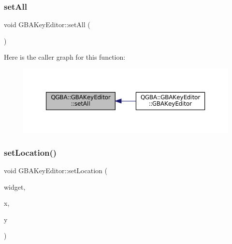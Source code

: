 \subsubsection{\texorpdfstring{set\+All}{setAll}}
{\footnotesize\ttfamily void G\+B\+A\+Key\+Editor\+::set\+All (\begin{DoxyParamCaption}{ }\end{DoxyParamCaption})\hspace{0.3cm}{\ttfamily [slot]}}

Here is the caller graph for this function\+:
\nopagebreak
\begin{figure}[H]
\begin{center}
\leavevmode
\includegraphics[width=350pt]{class_q_g_b_a_1_1_g_b_a_key_editor_a4069ad1c61470f1d304aa7b7cf944261_icgraph}
\end{center}
\end{figure}
\mbox{\label{class_q_g_b_a_1_1_g_b_a_key_editor_af41d655d8129ab4991fbb4b131705658}} 
\subsubsection{\texorpdfstring{set\+Location()}{setLocation()}}
{\footnotesize\ttfamily void G\+B\+A\+Key\+Editor\+::set\+Location (\begin{DoxyParamCaption}\item[{Q\+Widget $\ast$}]{widget,  }\item[{qreal}]{x,  }\item[{qreal}]{y }\end{DoxyParamCaption})\hspace{0.3cm}{\ttfamily [private]}}


